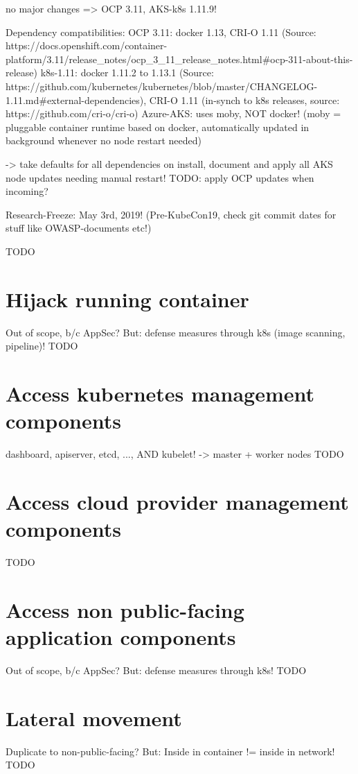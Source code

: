 no major changes => OCP 3.11, AKS-k8s 1.11.9!

Dependency compatibilities:
OCP 3.11: docker 1.13, CRI-O 1.11 (Source: https://docs.openshift.com/container-platform/3.11/release_notes/ocp_3_11_release_notes.html#ocp-311-about-this-release)
k8s-1.11: docker 1.11.2 to 1.13.1  (Source: https://github.com/kubernetes/kubernetes/blob/master/CHANGELOG-1.11.md#external-dependencies), CRI-O 1.11 (in-synch to k8s releases, source: https://github.com/cri-o/cri-o)
Azure-AKS: uses moby, NOT docker! (moby = pluggable container runtime based on docker, automatically updated in background whenever no node restart needed)

-> take defaults for all dependencies on install, document and apply all AKS node updates needing manual restart!
TODO: apply OCP updates when incoming?

Research-Freeze: May 3rd, 2019! (Pre-KubeCon19, check git commit dates for stuff like OWASP-documents etc!)

TODO

\section{Hijack running container}
Out of scope, b/c AppSec? But: defense measures through k8s (image scanning, pipeline)!
TODO

\section{Access kubernetes management components}
dashboard, apiserver, etcd, ..., AND kubelet! -> master + worker nodes
TODO

\section{Access cloud provider management components}
TODO

\section{Access non public-facing application components}
Out of scope, b/c AppSec? But: defense measures through k8s!
TODO

\section{Lateral movement}
Duplicate to non-public-facing? But: Inside in container != inside in network!
TODO

